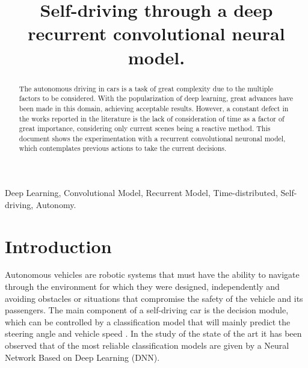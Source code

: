 \documentclass[conference]{IEEEtran}
\begin{document}
\title{Self-driving	through a deep recurrent convolutional neural model.}
\author{
	

\and

}
\maketitle

\begin{abstract}
The autonomous driving in cars is a task of great complexity due to the multiple factors to be considered. With the popularization of deep learning, great advances have been made in this domain, achieving acceptable results. However, a constant defect in the works reported in the literature is the lack of consideration of time as a factor of great importance, considering only current scenes being a reactive method. This document shows the experimentation with a recurrent convolutional neuronal model, which contemplates previous actions to take the current decisions.
\end{abstract}

\begin{IEEEkeywords}
Deep Learning, Convolutional Model, Recurrent Model, Time-distributed, Self-driving, Autonomy.
\end{IEEEkeywords}

\section{Introduction}
Autonomous vehicles are robotic systems that must have the ability to navigate through the environment for which they were designed, independently and avoiding obstacles or situations that compromise the safety of the vehicle and its passengers. The main component of a self-driving car is the decision module, which can be controlled by a classification model that will mainly predict the steering angle and vehicle speed \cite{litman2017autonomous}. In the study of the state of the art it has been observed that of the most reliable classification models are given by a Neural Network Based on Deep Learning (DNN).
\end{document}

